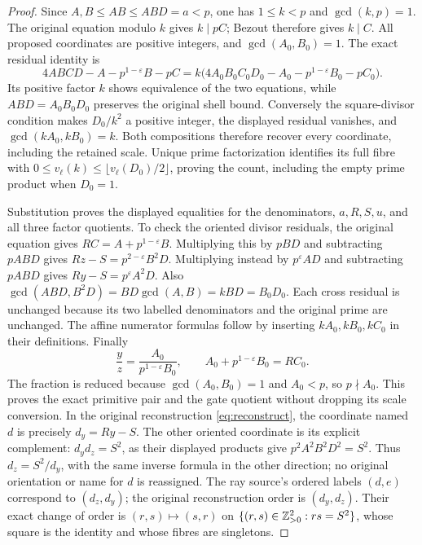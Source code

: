 \begin{proof}
Since \(A,B\le AB\le ABD=a<p\), one has \(1\le k<p\)
and \(\gcd(k,p)=1\).  The original equation modulo \(k\)
gives \(k\mid pC\); Bezout therefore gives \(k\mid C\).
All proposed coordinates are positive integers, and
\(\gcd(A_0,B_0)=1\).  The exact residual identity is
\[
 4ABCD-A-p^{1-\varepsilon}B-pC
 =k\bigl(4A_0B_0C_0D_0-A_0-p^{1-\varepsilon}B_0-pC_0\bigr).
\]
Its positive factor \(k\) shows equivalence of the two equations,
while \(ABD=A_0B_0D_0\) preserves the original shell bound.
Conversely the square-divisor condition makes \(D_0/k^2\) a
positive integer, the displayed residual vanishes, and
\(\gcd(kA_0,kB_0)=k\).  Both compositions therefore recover
every coordinate, including the retained scale.  Unique prime
factorization identifies its full fibre with
\(0\le v_\ell(k)\le\lfloor v_\ell(D_0)/2\rfloor\), proving
the count, including the empty prime product when \(D_0=1\).

Substitution proves the displayed equalities for the denominators,
\(a,R,S,u\), and all three factor quotients.  To check the oriented
divisor residuals, the original equation gives
\(RC=A+p^{1-\varepsilon}B\).  Multiplying this by \(pBD\)
and subtracting \(pABD\) gives \(Rz-S=p^{2-\varepsilon}B^2D\).
Multiplying instead by \(p^\varepsilon AD\) and subtracting
\(pABD\) gives \(Ry-S=p^\varepsilon A^2D\).
Also \(\gcd(ABD,B^2D)=BD\gcd(A,B)=kBD=B_0D_0\).
Each cross residual is unchanged because its two labelled
denominators and the original prime are unchanged.  The affine
numerator formulas follow by inserting \(kA_0,kB_0,kC_0\)
in their definitions.  Finally
\[
 \frac yz=\frac{A_0}{p^{1-\varepsilon}B_0},\qquad
 A_0+p^{1-\varepsilon}B_0=RC_0.
\]
The fraction is reduced because \(\gcd(A_0,B_0)=1\) and
\(A_0<p\), so \(p\nmid A_0\).  This proves the exact primitive
pair and the gate quotient without dropping its scale conversion.
In the original reconstruction \eqref{eq:reconstruct}, the coordinate
named \(d\) is precisely \(d_y=Ry-S\). The other oriented coordinate
is its explicit complement: \(d_y d_z=S^2\), as their displayed
products give \(p^2A^2B^2D^2=S^2\). Thus
\(d_z=S^2/d_y\), with the same inverse formula in the other direction;
no original orientation or name for \(d\) is reassigned.
The ray source's ordered labels \((d,e)\) correspond to
\((d_z,d_y)\); the original reconstruction order is
\((d_y,d_z)\). Their exact change of order is
\((r,s)\mapsto(s,r)\) on \(\{(r,s)\in\mathbb Z_{>0}^2:rs=S^2\}\),
whose square is the identity and whose fibres are singletons.
\end{proof}

